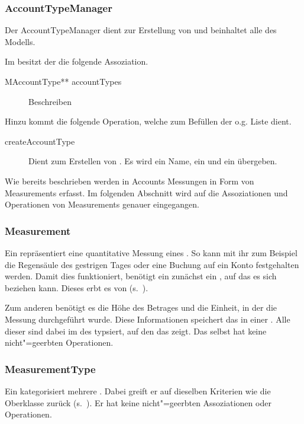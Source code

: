\subsubsection{AccountTypeManager}
Der AccountTypeManager dient zur Erstellung von  und beinhaltet alle  des Modells.

Im \MM besitzt der  die folgende Assoziation.
\begin{description}
	\item[MAccountType** accountTypes] Beschreiben
\end{description}

Hinzu kommt die folgende Operation, welche zum Befüllen der o.g. Liste dient.
\begin{description}
	\item[createAccountType] Dient zum Erstellen von . 
	Es wird ein Name, ein  und ein  übergeben.
\end{description}

Wie bereits beschrieben werden in Accounts Messungen in Form von Measurements erfasst. 
Im folgenden Abschnitt wird auf die Assoziationen und Operationen von Measurements genauer eingegangen.


\subsubsection{Measurement}
Ein  repräsentiert eine quantitative Messung eines . So kann mit ihr zum Beispiel die Regensäule des gestrigen Tages
oder eine Buchung auf ein Konto festgehalten werden. Damit dies funktioniert, benötigt ein  zunächst ein , auf das es
sich beziehen kann. Dieses erbt es von  (s.~).

Zum anderen benötigt es die Höhe des Betrages und die Einheit, in der die Messung durchgeführt wurde. Diese Informationen speichert das 
in einer . Alle  dieser  sind dabei im  des  typsiert,
auf den das  zeigt. Das  selbst hat keine nicht"=geerbten Operationen.


\subsubsection{MeasurementType}
Ein  kategorisiert mehrere . Dabei greift er auf dieselben Kriterien wie die Oberklasse 
zurück (s.~). Er hat keine nicht"=geerbten Assoziationen oder Operationen.


